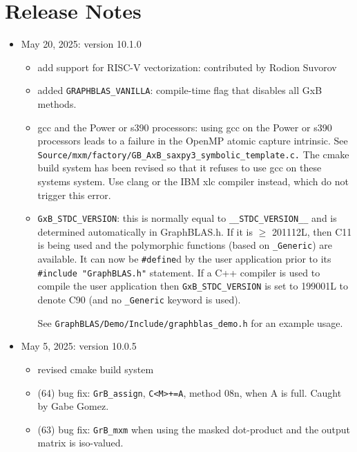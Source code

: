 
\section{Release Notes}

\begin{itemize}

\item May 20, 2025: version 10.1.0

    \begin{itemize}
    \item add support for RISC-V vectorization: contributed by Rodion Suvorov
    \item added \verb'GRAPHBLAS_VANILLA': compile-time flag that disables all
        GxB methods.
    \item gcc and the Power or s390 processors:  using gcc on the Power or s390
        processors leads to a failure in the OpenMP atomic capture intrinsic.
        See \verb'Source/mxm/factory/GB_AxB_saxpy3_symbolic_template.c.'  The
        cmake build system has been revised so that it refuses to use gcc on
        these systems system.  Use clang or the IBM xlc compiler instead, which
        do not trigger this error.
    \item \verb'GxB_STDC_VERSION': this is normally equal to
        \verb'__STDC_VERSION__' and is determined automatically in GraphBLAS.h.
        If it is $\ge$ 201112L, then C11 is being used and the polymorphic
        functions (based on \verb'_Generic') are available.  It can now be
        \verb'#define'd by the user application prior to its
        \verb'#include "GraphBLAS.h"' statement.  If a C++ compiler is used to
        compile the user application then \verb'GxB_STDC_VERSION' is set to
        199001L to denote C90 (and no \verb'_Generic' keyword is used).

        See \verb'GraphBLAS/Demo/Include/graphblas_demo.h' for an example usage.
    \end{itemize}

\item May 5, 2025: version 10.0.5

    \begin{itemize}
    \item revised cmake build system
    \item (64) bug fix: \verb'GrB_assign', \verb'C<M>+=A',
        method 08n, when A is full.  Caught by Gabe Gomez.
    \item (63) bug fix: \verb'GrB_mxm' when using the masked dot-product
        and the output matrix is iso-valued.
    \end{itemize}


\end{itemize}

